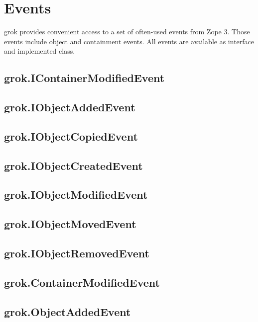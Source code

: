 \chapter{Events}

grok provides convenient access to a set of often-used events from Zope 3.
Those events include object and containment events. All events are available as
interface and implemented class.

    \section{grok.IContainerModifiedEvent}

    \section{grok.IObjectAddedEvent}

    \section{grok.IObjectCopiedEvent}

    \section{grok.IObjectCreatedEvent}

    \section{grok.IObjectModifiedEvent}

    \section{grok.IObjectMovedEvent}

    \section{grok.IObjectRemovedEvent}

    \section{grok.ContainerModifiedEvent}

    \section{grok.ObjectAddedEvent}


